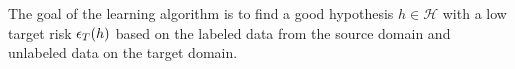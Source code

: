 The goal of the learning algorithm is to find a good hypothesis $h \in \mathcal{H}$ with a low target risk $\epsilon_{T}(h)$ based on the labeled data from the source domain and unlabeled data on the target domain.



